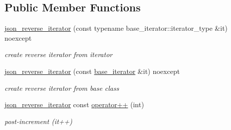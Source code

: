 \subsection*{Public Member Functions}
\begin{DoxyCompactItemize}
\item 
\mbox{\label{classnlohmann_1_1detail_1_1json__reverse__iterator_a0246de16ece16293f2917dfa5d96e278}} 
\mbox{\hyperlink{classnlohmann_1_1detail_1_1json__reverse__iterator_a0246de16ece16293f2917dfa5d96e278}{json\+\_\+reverse\+\_\+iterator}} (const typename base\+\_\+iterator\+::iterator\+\_\+type \&it) noexcept
\begin{DoxyCompactList}\small\item\em create reverse iterator from iterator \end{DoxyCompactList}\item 
\mbox{\label{classnlohmann_1_1detail_1_1json__reverse__iterator_a6c2d025530114ed989188e8adfc8467e}} 
\mbox{\hyperlink{classnlohmann_1_1detail_1_1json__reverse__iterator_a6c2d025530114ed989188e8adfc8467e}{json\+\_\+reverse\+\_\+iterator}} (const \mbox{\hyperlink{classnlohmann_1_1detail_1_1json__reverse__iterator_a6b2ef1d632fe49bfcc22fbd1abd62395}{base\+\_\+iterator}} \&it) noexcept
\begin{DoxyCompactList}\small\item\em create reverse iterator from base class \end{DoxyCompactList}\item 
\mbox{\label{classnlohmann_1_1detail_1_1json__reverse__iterator_aada9d2b320002ef870c5283cda2c1e9d}} 
\mbox{\hyperlink{classnlohmann_1_1detail_1_1json__reverse__iterator}{json\+\_\+reverse\+\_\+iterator}} const \mbox{\hyperlink{classnlohmann_1_1detail_1_1json__reverse__iterator_aada9d2b320002ef870c5283cda2c1e9d}{operator++}} (int)
\begin{DoxyCompactList}\small\item\em post-\/increment (it++) \end{DoxyCompactList}\item 
\mbox{\label{classnlohmann_1_1detail_1_1json__reverse__iterator_a26caf0069a50ce4ecb010a1453e883fc}} 

\end{DoxyCompactItemize}

